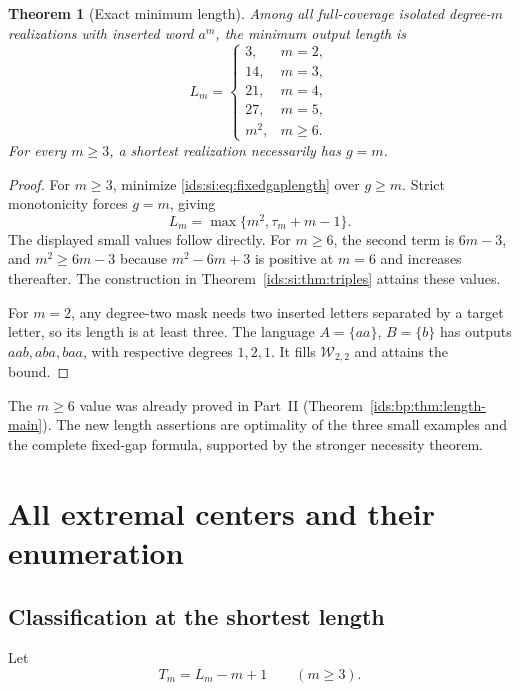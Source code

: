 \documentclass[11pt,letterpaper]{article}
\newtheorem{theorem}{Theorem}[section]
\theoremstyle{definition}\newtheorem{definition}[theorem]{Definition}
\theoremstyle{remark}\newtheorem{remark}[theorem]{Remark}
\theoremstyle{definition}\newtheorem{question}[theorem]{Question}
\newcommand{\bpW}[2]{\mathcal W_{#1,#2}}
\begin{document}
\begin{theorem}[Exact minimum length]\label{ids:si:thm:length}
Among all full-coverage isolated degree-$m$ realizations with inserted word
$a^m$, the minimum output length is
\begin{equation}\label{ids:si:eq:length}
 L_m=\begin{cases}
 3,&m=2,\\
 14,&m=3,\\
 21,&m=4,\\
 27,&m=5,\\
 m^2,&m\geq6.
 \end{cases}
\end{equation}
For every $m\geq3$, a shortest realization necessarily has $g=m$.
\end{theorem}
\begin{proof}
For $m\geq3$, minimize \eqref{ids:si:eq:fixedgaplength} over $g\geq m$. Strict
monotonicity forces $g=m$, giving
\[
 L_m=\max\{m^2,\tau_m+m-1\}.
\]
The displayed small values follow directly. For $m\geq6$, the second term
is $6m-3$, and $m^2\geq6m-3$ because $m^2-6m+3$ is positive at $m=6$
and increases thereafter. The construction in Theorem~\ref{ids:si:thm:triples} attains
these values.

For $m=2$, any degree-two mask needs two inserted letters separated by a
target letter, so its length is at least three. The language
$A=\{aa\}$, $B=\{b\}$ has outputs $aab,aba,baa$, with respective degrees
$1,2,1$. It fills $\bpW{2}{2}$ and attains the bound.
\end{proof}
The $m\geq6$ value was already proved in Part~II
(Theorem~\ref{ids:bp:thm:length-main}). The new
length assertions are optimality of the three small examples and the
complete fixed-gap formula, supported by the stronger necessity theorem.

\section{All extremal centers and their enumeration}\label{ids:si:sec:extremal}

\subsection{Classification at the shortest length}
Let
\begin{equation}\label{ids:si:eq:Tstar}
 T_m=L_m-m+1\qquad(m\geq3).
\end{equation}
\end{document}
